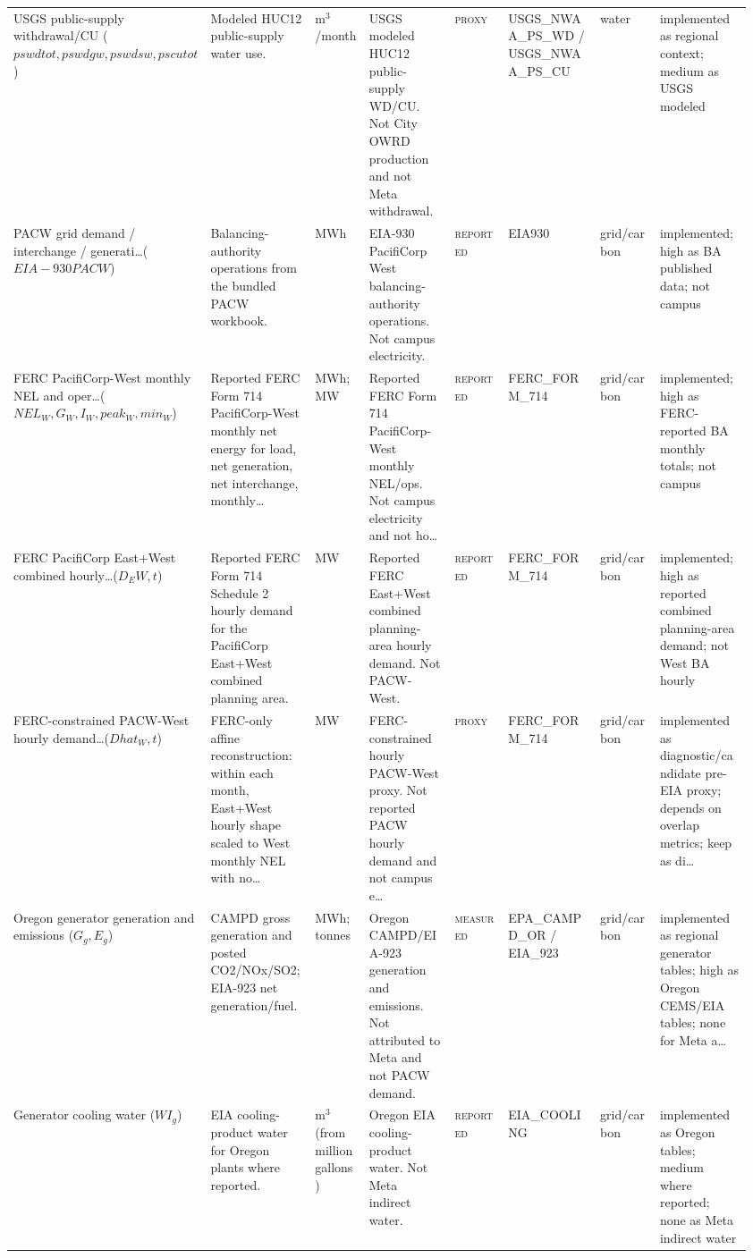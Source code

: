 \documentclass[11pt]{article}
\newcommand{\Reported}{\textsc{reported}}
\newcommand{\Measured}{\textsc{measured}}
\newcommand{\Proxy}{\textsc{proxy}}
\begin{document}
\begin{longtable}{@{}p{0.14\linewidth}p{0.16\linewidth}p{0.08\linewidth}p{0.13\linewidth}p{0.08\linewidth}p{0.14\linewidth}p{0.09\linewidth}p{0.14\linewidth}@{}}
USGS public-supply withdrawal/CU ($pswdtot, pswdgw, pswdsw, pscutot$) & Modeled HUC12 public-supply water use. & m$^{3}$/month & USGS modeled HUC12 public-supply WD/CU. Not City OWRD production and not Meta withdrawal. & \Proxy{} & USGS\_NWAA\_PS\_WD / USGS\_NWAA\_PS\_CU & water & implemented as regional context; medium as USGS modeled\\
PACW grid demand / interchange / generati\ldots ($EIA-930 PACW$) & Balancing-authority operations from the bundled PACW workbook. & MWh & EIA-930 PacifiCorp West balancing-authority operations. Not campus electricity. & \Reported{} & EIA930 & grid/carbon & implemented; high as BA published data; not campus\\
FERC PacifiCorp-West monthly NEL and oper\ldots ($NEL_W, G_W, I_W, peak_W, min_W$) & Reported FERC Form 714 PacifiCorp-West monthly net energy for load, net generation, net interchange, monthly\ldots & MWh; MW & Reported FERC Form 714 PacifiCorp-West monthly NEL/ops. Not campus electricity and not ho\ldots & \Reported{} & FERC\_FORM\_714 & grid/carbon & implemented; high as FERC-reported BA monthly totals; not campus\\
FERC PacifiCorp East+West combined hourly\ldots ($D_EW,t$) & Reported FERC Form 714 Schedule 2 hourly demand for the PacifiCorp East+West combined planning area. & MW & Reported FERC East+West combined planning-area hourly demand. Not PACW-West. & \Reported{} & FERC\_FORM\_714 & grid/carbon & implemented; high as reported combined planning-area demand; not West BA hourly\\
FERC-constrained PACW-West hourly demand\ldots ($Dhat_W,t$) & FERC-only affine reconstruction: within each month, East+West hourly shape scaled to West monthly NEL with no\ldots & MW & FERC-constrained hourly PACW-West proxy. Not reported PACW hourly demand and not campus e\ldots & \Proxy{} & FERC\_FORM\_714 & grid/carbon & implemented as diagnostic/candidate pre-EIA proxy; depends on overlap metrics; keep as di\ldots\\
Oregon generator generation and emissions ($G_g, E_g$) & CAMPD gross generation and posted CO2/NOx/SO2; EIA-923 net generation/fuel. & MWh; tonnes & Oregon CAMPD/EIA-923 generation and emissions. Not attributed to Meta and not PACW demand. & \Measured{} & EPA\_CAMPD\_OR / EIA\_923 & grid/carbon & implemented as regional generator tables; high as Oregon CEMS/EIA tables; none for Meta a\ldots\\
Generator cooling water ($WI_g$) & EIA cooling-product water for Oregon plants where reported. & m$^{3}$ (from million gallons) & Oregon EIA cooling-product water. Not Meta indirect water. & \Reported{} & EIA\_COOLING & grid/carbon & implemented as Oregon tables; medium where reported; none as Meta indirect water\\

\end{longtable}
\end{document}
